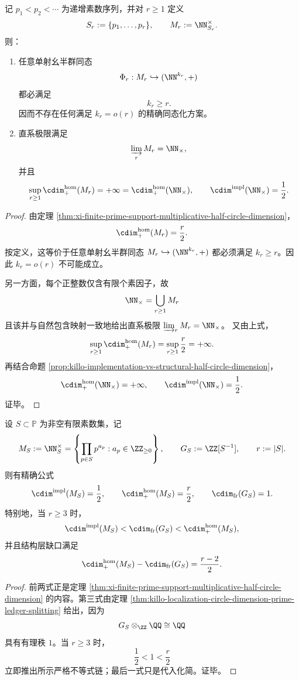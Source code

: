 \begin{corollary}[有限素数截断乘法账本的线性寄存器律与全局不可有限化]\label{cor:xi-finite-prime-support-linear-register-law}
记 \(p_1<p_2<\cdots\) 为递增素数序列，并对 \(r\ge 1\) 定义
\[
S_r:=\{p_1,\dots,p_r\},
\qquad
M_r:=\NN_{S_r}^{\times}.
\]
则：
\begin{enumerate}
  \item 任意单射幺半群同态
  \[
  \Phi_r:M_r\hookrightarrow (\NN^{k_r},+)
  \]
  都必满足
  \[
  k_r\ge r.
  \]
  因而不存在任何满足 \(k_r=o(r)\) 的精确同态化方案。
  \item 直系极限满足
  \[
  \varinjlim_{r}M_r=\NN_{\times},
  \]
  并且
  \[
  \sup_{r\ge 1}\cdim^{\mathrm{hom}}_{+}(M_r)
  =
  +\infty
  =
  \cdim^{\mathrm{hom}}_{+}(\NN_{\times}),
  \qquad
  \cdim^{\mathrm{impl}}(\NN_{\times})=\frac12.
  \]
\end{enumerate}
\end{corollary}
\begin{proof}
由定理 \ref{thm:xi-finite-prime-support-multiplicative-half-circle-dimension}，
\[
\cdim^{\mathrm{hom}}_{+}(M_r)=\frac{r}{2}.
\]
按定义，这等价于任意单射幺半群同态 \(M_r\hookrightarrow (\NN^{k_r},+)\) 都必须满足 \(k_r\ge r\)。因此 \(k_r=o(r)\) 不可能成立。

另一方面，每个正整数仅含有限个素因子，故
\[
\NN_{\times}=\bigcup_{r\ge 1}M_r
\]
且该并与自然包含映射一致地给出直系极限 \(\varinjlim_r M_r=\NN_{\times}\)。
又由上式，
\[
\sup_{r\ge 1}\cdim^{\mathrm{hom}}_{+}(M_r)
=
\sup_{r\ge 1}\frac{r}{2}
=+\infty.
\]
再结合命题 \ref{prop:killo-implementation-vs-structural-half-circle-dimension}，
\[
\cdim^{\mathrm{hom}}_{+}(\NN_{\times})=+\infty,
\qquad
\cdim^{\mathrm{impl}}(\NN_{\times})=\frac12.
\]
证毕。
\end{proof}

\begin{corollary}[有限素数支撑乘法半群与局部化数系的三层圆维分裂]\label{cor:xi-finite-prime-support-threeway-cdim-split}
设 \(S\subset\mathbb P\) 为非空有限素数集，记
\[
M_S:=\NN_S^\times
=
\left\{\prod_{p\in S}p^{a_p}:a_p\in\ZZ_{\ge 0}\right\},
\qquad
G_S:=\ZZ[S^{-1}],
\qquad
r:=|S|.
\]
则有精确公式
\[
\cdim^{\mathrm{impl}}(M_S)=\frac12,
\qquad
\cdim^{\mathrm{hom}}_{+}(M_S)=\frac{r}{2},
\qquad
\cdim_{\mathrm{fr}}(G_S)=1.
\]
特别地，当 \(r\ge 3\) 时，
\[
\cdim^{\mathrm{impl}}(M_S)
<
\cdim_{\mathrm{fr}}(G_S)
<
\cdim^{\mathrm{hom}}_{+}(M_S),
\]
并且结构层缺口满足
\[
\cdim^{\mathrm{hom}}_{+}(M_S)-\cdim_{\mathrm{fr}}(G_S)=\frac{r-2}{2}.
\]
\end{corollary}
\begin{proof}
前两式正是定理 \ref{thm:xi-finite-prime-support-multiplicative-half-circle-dimension} 的内容。第三式由定理 \ref{thm:killo-localization-circle-dimension-prime-ledger-splitting} 给出，因为
\[
G_S\otimes_{\ZZ}\QQ\cong \QQ
\]
具有有理秩 \(1\)。当 \(r\ge 3\) 时，
\[
\frac12<1<\frac{r}{2}
\]
立即推出所示严格不等式链；最后一式只是代入化简。证毕。
\end{proof}


